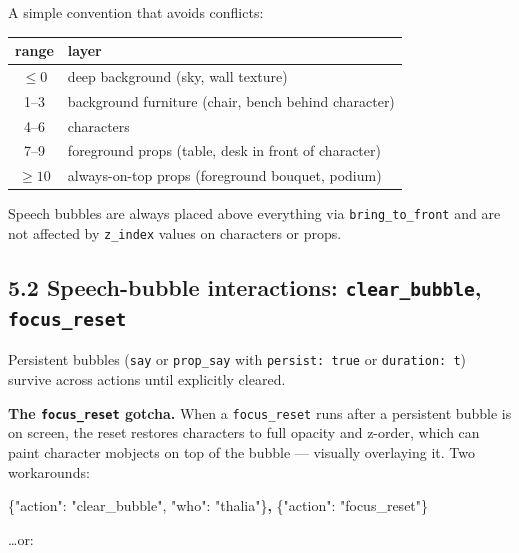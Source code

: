 \documentclass[
  12pt,
  letterpaper,
]{book}
\newenvironment{Shaded}{}{}
\newcommand{\DataTypeTok}[1]{\textcolor[rgb]{0.56,0.13,0.00}{#1}}
\newcommand{\ErrorTok}[1]{\textcolor[rgb]{1.00,0.00,0.00}{\textbf{#1}}}
\newcommand{\FunctionTok}[1]{\textcolor[rgb]{0.02,0.16,0.49}{#1}}
\newcommand{\StringTok}[1]{\textcolor[rgb]{0.25,0.44,0.63}{#1}}
\begin{document}
A simple convention that avoids conflicts:

\begin{center}
\begin{tabular}{cl}
\textbf{range} & \textbf{layer} \\
\hline
$\leq 0$ & deep background (sky, wall texture) \\
1--3 & background furniture (chair, bench behind character) \\
4--6 & characters \\
7--9 & foreground props (table, desk in front of character) \\
$\geq 10$ & always-on-top props (foreground bouquet, podium) \\
\end{tabular}
\end{center}

Speech bubbles are always placed above everything via
\texttt{bring\_to\_front} and are not affected by \texttt{z\_index}
values on characters or props.

\subsection{\texorpdfstring{5.2 Speech-bubble interactions:
\texttt{clear\_bubble},
\texttt{focus\_reset}}{5.2 Speech-bubble interactions: clear\_bubble, focus\_reset}}\label{speech-bubble-interactions-clear_bubble-focus_reset}

Persistent bubbles (\texttt{say} or \texttt{prop\_say} with
\texttt{persist:\ true} or \texttt{duration:\ t}) survive across actions
until explicitly cleared.

\textbf{The \texttt{focus\_reset} gotcha.} When a \texttt{focus\_reset}
runs after a persistent bubble is on screen, the reset restores
characters to full opacity and z-order, which can paint character
mobjects on top of the bubble --- visually overlaying it. Two
workarounds:

\begin{Shaded}
\begin{Highlighting}[]
\FunctionTok{\{}\DataTypeTok{"action"}\FunctionTok{:} \StringTok{"clear\_bubble"}\FunctionTok{,} \DataTypeTok{"who"}\FunctionTok{:} \StringTok{"thalia"}\FunctionTok{\}}\ErrorTok{,}
\FunctionTok{\{}\DataTypeTok{"action"}\FunctionTok{:} \StringTok{"focus\_reset"}\FunctionTok{\}}
\end{Highlighting}
\end{Shaded}

\ldots or:
\end{document}
